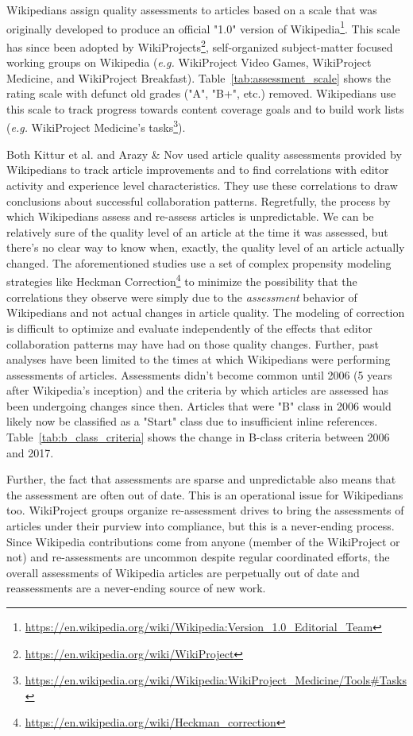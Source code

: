 

 Wikipedians assign quality assessments to articles based on a scale that was originally developed to produce an official "1.0" version of Wikipedia\footnote{\url{https://en.wikipedia.org/wiki/Wikipedia:Version_1.0_Editorial_Team}}.  This scale has since been adopted by WikiProjects\footnote{\url{https://en.wikipedia.org/wiki/WikiProject}}, self-organized subject-matter focused working groups on Wikipedia (\emph{e.g.} WikiProject Video Games, WikiProject Medicine, and WikiProject Breakfast).  Table~\ref{tab:assessment_scale} shows the rating scale with defunct old grades ("A", "B+", etc.) removed.  Wikipedians use this scale to track progress towards content coverage goals and to build work lists (\emph{e.g.} WikiProject Medicine's tasks\footnote{\url{https://en.wikipedia.org/wiki/Wikipedia:WikiProject_Medicine/Tools\#Tasks}}).

Both Kittur et al.\cite{kittur08harnessing} and Arazy \& Nov\cite{arazy10determinants} used article quality assessments provided by Wikipedians to track article improvements and to find correlations with editor activity and experience level characteristics.  They use these correlations to draw conclusions about successful collaboration patterns.  Regretfully, the process by which Wikipedians assess and re-assess articles is unpredictable.  We can be relatively sure of the quality level of an article at the time it was assessed, but there's no clear way to know when, exactly, the quality level of an article actually changed.  The aforementioned studies use a set of complex propensity modeling strategies like Heckman Correction\footnote{\url{https://en.wikipedia.org/wiki/Heckman_correction}} to minimize the possibility that the correlations they observe were simply due to the \emph{assessment} behavior of Wikipedians and not actual changes in article quality.  The modeling of correction is difficult to optimize and evaluate independently of the effects that editor collaboration patterns may have had on those quality changes.  Further, past analyses have been limited to the times at which Wikipedians were performing assessments of articles.  Assessments didn't become common until 2006 (5 years after Wikipedia's inception) and the criteria by which articles are assessed has been undergoing changes since then.  Articles that were "B" class in 2006 would likely now be classified as a "Start" class due to insufficient inline references.  Table~\ref{tab:b_class_criteria} shows the change in B-class criteria between 2006 and 2017.

Further, the fact that assessments are sparse and unpredictable also means that the assessment are often out of date.  This is an operational issue for Wikipedians too.  WikiProject groups organize re-assessment drives to bring the assessments of articles under their purview into compliance, but this is a never-ending process.  Since Wikipedia contributions come from anyone (member of the WikiProject or not) and re-assessments are uncommon despite regular coordinated efforts, the overall assessments of Wikipedia articles are perpetually out of date and reassessments are a never-ending source of new work.


